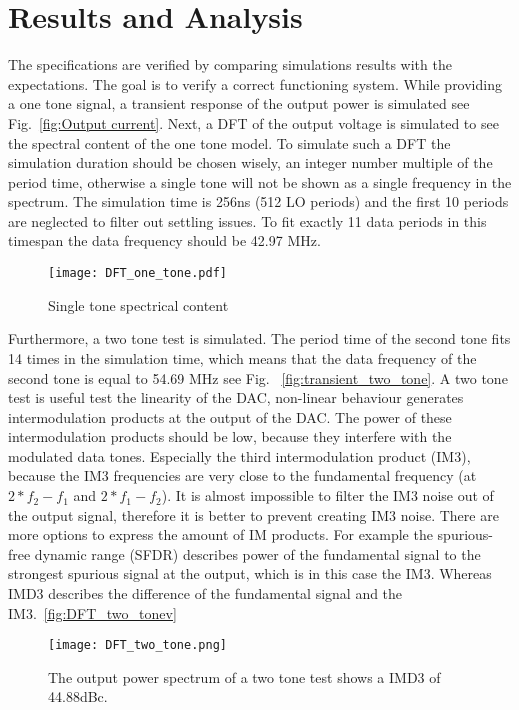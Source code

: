 \section{Results and Analysis}\label{sec:simulations}
The specifications are verified by comparing simulations results with the expectations. The goal is to verify a correct functioning system. While providing a one tone signal, a transient response of the output power is simulated see Fig.~\ref{fig:Output current}.
Next, a DFT of the output voltage is simulated to see the spectral content of the one tone model. To simulate such a DFT the simulation duration should be chosen wisely, an integer number multiple of the period time, otherwise a single tone will not be shown as a single frequency in the spectrum. The simulation time is 256ns (512 LO periods) and the first 10 periods are neglected to filter out settling issues. To fit exactly 11 data periods in this timespan the data frequency should be 42.97 MHz.
\begin{figure}[h] 
\texttt{[image: DFT\_one\_tone.pdf]}
\caption{Single tone spectrical content}
\label{fig:transient_single_tone}
\end{figure}
Furthermore, a two tone test is simulated. The period time of the second tone fits 14 times in the simulation time, which means that the data frequency of the second tone is equal to 54.69 MHz see Fig. ~\ref{fig:transient_two_tone}. A two tone test is useful test the linearity of the DAC, non-linear behaviour generates intermodulation products at the output of the DAC. The power of these intermodulation products should be low, because they interfere with the modulated data tones. Especially the third intermodulation product (IM3), because the IM3 frequencies are very close to the fundamental frequency (at $2*f_2-f_1$ and $2*f_1-f_2$). It is almost impossible to filter the IM3 noise out of the output signal, therefore it is better to prevent creating IM3 noise. There are more options to express the amount of IM products. For example the spurious-free dynamic range (SFDR) describes power of the fundamental signal to the strongest spurious signal at the output, which is in this case the IM3. Whereas IMD3 describes the difference of the fundamental signal and the IM3.~\ref{fig:DFT_two_tonev}
\begin{figure}[h] 
\texttt{[image: DFT\_two\_tone.png]}
\caption{The output power spectrum of a two tone test shows a IMD3 of 44.88dBc.}
\label{fig:DFT_two_tone}
\end{figure}

